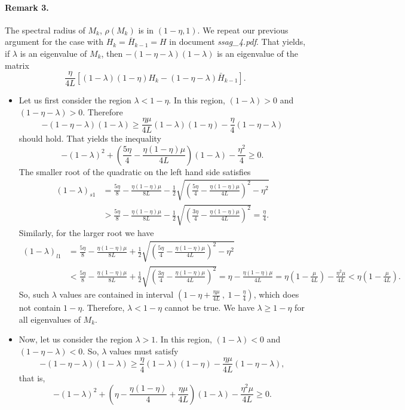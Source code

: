 \documentclass{article}
\begin{document}
\paragraph{Remark 3.} The spectral radius of $M_k$, $\rho(M_k)$ is in $(1-\eta,1)$.  We repeat our previous argument for the case with $H_k=\bar H_{k-1}=H$ in document \emph{ssag\_4.pdf}.  That yields, if $\lambda$ is an eigenvalue of $M_k$, then 
$ -(1-\eta-\lambda)(1-\lambda)$ is an eigenvalue of the matrix 
\[
 \frac{\eta}{4L}[(1-\lambda)(1-\eta)H_k-(1-\eta-\lambda)\bar H_{k-1}].
\]
\begin{itemize}
\item Let us first consider the region $\lambda<1-\eta$.  In this region, $(1-\lambda)>0$ and $(1-\eta-\lambda)>0$.  Therefore
\[
 -(1-\eta-\lambda)(1-\lambda)\geq\frac{\eta\mu}{4L}(1-\lambda)(1-\eta)-\frac{\eta}{4}(1-\eta-\lambda)
\]
should hold. That yields the inequality
\[
   -(1-\lambda)^2 +\left(\frac{5\eta}{4}-\frac{\eta(1-\eta)\mu}{4L}\right)(1-\lambda)-\frac{\eta^2}{4} \geq 0.
\]
The smaller root of the quadratic on the left hand side satisfies 
  \begin{align*}
   (1-\lambda)_{s1} &= \frac{5\eta}{8}-\frac{\eta(1-\eta)\mu}{8L}-\frac{1}{2}\sqrt{\left(\frac{5\eta}{4}-\frac{\eta(1-\eta)\mu}{4L}\right)^2-\eta^2}\\ 
   &> \frac{5\eta}{8}-\frac{\eta(1-\eta)\mu}{8L}-\frac{1}{2}\sqrt{\left(\frac{3\eta}{4}-\frac{\eta(1-\eta)\mu}{4L}\right)^2} = \frac{\eta}{4}.
  \end{align*}
 Similarly, for the larger root we have
  \begin{align*}
   (1-\lambda)_{l1} &= \frac{5\eta}{8}-\frac{\eta(1-\eta)\mu}{8L}+\frac{1}{2}\sqrt{\left(\frac{5\eta}{4}-\frac{\eta(1-\eta)\mu}{4L}\right)^2-\eta^2}\\ 
   &< \frac{5\eta}{8}-\frac{\eta(1-\eta)\mu}{8L}+\frac{1}{2}\sqrt{\left(\frac{3\eta}{4}-\frac{\eta(1-\eta)\mu}{4L}\right)^2} = \eta-\frac{\eta(1-\eta)\mu}{4L} = \eta(1-\frac{\mu}{4L}) - \frac{\eta^2\mu}{4L}<\eta(1-\frac{\mu}{4L}).
  \end{align*}
 So, such $\lambda$ values are contained in interval $\left(\displaystyle1-\eta + \frac{\eta\mu}{4L} \ , \ 1-\frac{\eta}{4}\right)$, which does not contain $1-\eta$.  Therefore, $\lambda < 1-\eta$ cannot be true. We have $\lambda\geq 1-\eta$ for all eigenvalues of $M_k$. 
 
 \bigskip
 
 \item Now, let us consider the region  $\lambda>1$. In this region, $(1-\lambda)<0$ and $(1-\eta-\lambda)<0$.  So, $\lambda$ values must satisfy 
 \[
-(1-\eta-\lambda)(1-\lambda)\geq\frac{\eta}{4}(1-\lambda)(1-\eta)-\frac{\eta\mu}{4L}(1-\eta-\lambda),
\]
that is,
  \[
   -(1-\lambda)^2+\left(\eta-\frac{\eta(1-\eta)}{4}+\frac{\eta\mu}{4L}\right)(1-\lambda)-\frac{\eta^2\mu}{4L}\geq 0.
  \]
\end{itemize}
\end{document}
